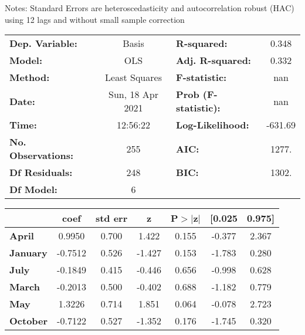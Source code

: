 Notes: \newline
 [1] Standard Errors are heteroscedasticity and autocorrelation robust (HAC) using 12 lags and without small sample correction
\begin{center}
\begin{tabular}{lclc}
\toprule
\textbf{Dep. Variable:}    &      Basis       & \textbf{  R-squared:         } &     0.348   \\
\textbf{Model:}            &       OLS        & \textbf{  Adj. R-squared:    } &     0.332   \\
\textbf{Method:}           &  Least Squares   & \textbf{  F-statistic:       } &       nan   \\
\textbf{Date:}             & Sun, 18 Apr 2021 & \textbf{  Prob (F-statistic):} &      nan    \\
\textbf{Time:}             &     12:56:22     & \textbf{  Log-Likelihood:    } &   -631.69   \\
\textbf{No. Observations:} &         255      & \textbf{  AIC:               } &     1277.   \\
\textbf{Df Residuals:}     &         248      & \textbf{  BIC:               } &     1302.   \\
\textbf{Df Model:}         &           6      & \textbf{                     } &             \\
\bottomrule
\end{tabular}
\begin{tabular}{lcccccc}
                 & \textbf{coef} & \textbf{std err} & \textbf{z} & \textbf{P$> |$z$|$} & \textbf{[0.025} & \textbf{0.975]}  \\
\midrule
\textbf{April}   &       0.9950  &        0.700     &     1.422  &         0.155        &       -0.377    &        2.367     \\
\textbf{January} &      -0.7512  &        0.526     &    -1.427  &         0.153        &       -1.783    &        0.280     \\
\textbf{July}    &      -0.1849  &        0.415     &    -0.446  &         0.656        &       -0.998    &        0.628     \\
\textbf{March}   &      -0.2013  &        0.500     &    -0.402  &         0.688        &       -1.182    &        0.779     \\
\textbf{May}     &       1.3226  &        0.714     &     1.851  &         0.064        &       -0.078    &        2.723     \\
\textbf{October} &      -0.7122  &        0.527     &    -1.352  &         0.176        &       -1.745    &        0.320     \\

\end{tabular}
\end{center}
